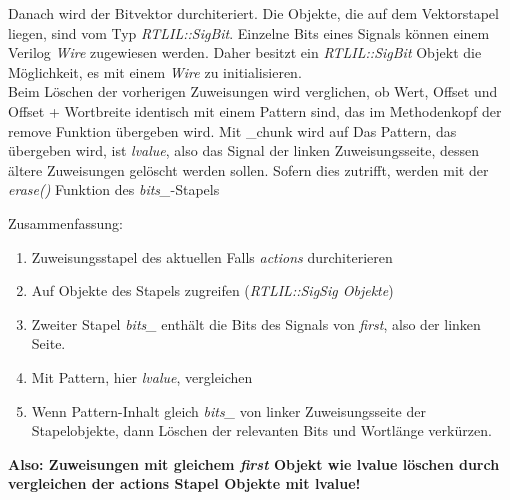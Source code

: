 \documentclass[11pt]{report}
\begin{document}
\begin{enumerate}
Danach wird der Bitvektor durchiteriert. Die Objekte, die auf dem Vektorstapel liegen, sind vom Typ \textit{RTLIL::SigBit}. Einzelne Bits eines Signals können einem Verilog \textit{Wire} zugewiesen werden. Daher besitzt ein \textit{RTLIL::SigBit} Objekt die Möglichkeit, es mit einem \textit{Wire} zu initialisieren.\\
Beim Löschen der vorherigen Zuweisungen wird verglichen, ob Wert, Offset und Offset + Wortbreite identisch mit einem Pattern sind, das im Methodenkopf der remove Funktion übergeben wird.
Mit \_chunk wird auf 
Das Pattern, das übergeben wird, ist \textit{lvalue}, also das Signal der linken Zuweisungsseite, dessen ältere Zuweisungen gelöscht werden sollen.
Sofern dies zutrifft, werden mit der \textit{erase()} Funktion des \textit{bits\_}-Stapels

Zusammenfassung:
\begin{enumerate}
  \item Zuweisungsstapel des aktuellen Falls \textit{actions} durchiterieren
  \item Auf Objekte des Stapels zugreifen (\textit{RTLIL::SigSig Objekte})
  \item Zweiter Stapel \textit{bits\_} enthält die Bits des Signals von \textit{first}, also der linken Seite.
  \item Mit Pattern, hier \textit{lvalue}, vergleichen
  \item Wenn Pattern-Inhalt gleich \textit{bits\_} von linker Zuweisungsseite der Stapelobjekte, dann Löschen der relevanten Bits und Wortlänge verkürzen.
\end{enumerate}
\textbf{Also: Zuweisungen mit gleichem \textit{first} Objekt wie lvalue löschen durch vergleichen der actions Stapel Objekte mit lvalue!}

\end{enumerate}
\end{document}
